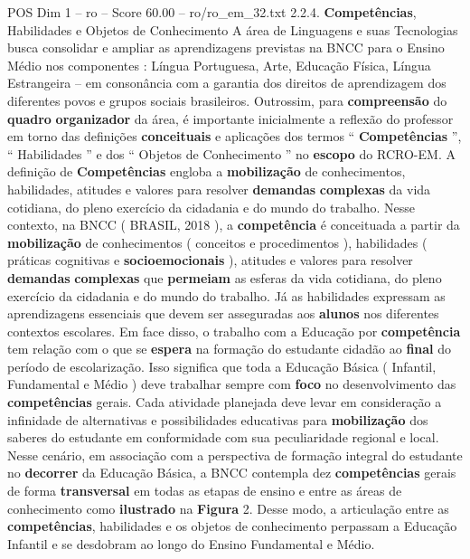 \begin{textsample}{POS Dim 1 – ro – Score 60.00 – ro/ro\_em\_32.txt}  \label{ex:f1_pos_133}
2.2.4. \textbf{Competências}, Habilidades e Objetos de Conhecimento A área de Linguagens e suas Tecnologias busca consolidar e ampliar as aprendizagens previstas na BNCC para o Ensino Médio nos componentes : Língua Portuguesa, Arte, Educação Física, Língua Estrangeira – em consonância com a garantia dos direitos de aprendizagem dos diferentes povos e grupos sociais brasileiros.
Outrossim, para \textbf{compreensão} do \textbf{quadro} \textbf{organizador} da área, é importante inicialmente a reflexão do professor em torno das definições \textbf{conceituais} e aplicações dos termos “ \textbf{Competências} ”, “ Habilidades ” e dos “ Objetos de Conhecimento ” no \textbf{escopo} do RCRO-EM.
A definição de \textbf{Competências} engloba a \textbf{mobilização} de conhecimentos, habilidades, atitudes e valores para resolver \textbf{demandas} \textbf{complexas} da vida cotidiana, do pleno exercício da cidadania e do mundo do trabalho.
Nesse contexto, na BNCC ( BRASIL, 2018 ), a \textbf{competência} é conceituada a partir da \textbf{mobilização} de conhecimentos ( conceitos e procedimentos ), habilidades ( práticas cognitivas e \textbf{socioemocionais} ), atitudes e valores para resolver \textbf{demandas} \textbf{complexas} que \textbf{permeiam} as esferas da vida cotidiana, do pleno exercício da cidadania e do mundo do trabalho.
Já as habilidades expressam as aprendizagens essenciais que devem ser asseguradas aos \textbf{alunos} nos diferentes contextos escolares.
Em face disso, o trabalho com a Educação por \textbf{competência} tem relação com o que se \textbf{espera} na formação do estudante cidadão ao \textbf{final} do período de escolarização.
Isso significa que toda a Educação Básica ( Infantil, Fundamental e Médio ) deve trabalhar sempre com \textbf{foco} no desenvolvimento das \textbf{competências} gerais.
Cada atividade planejada deve levar em consideração a infinidade de alternativas e possibilidades educativas para \textbf{mobilização} dos saberes do estudante em conformidade com sua peculiaridade regional e local.
Nesse cenário, em associação com a perspectiva de formação integral do estudante no \textbf{decorrer} da Educação Básica, a BNCC contempla dez \textbf{competências} gerais de forma \textbf{transversal} em todas as etapas de ensino e entre as áreas de conhecimento como \textbf{ilustrado} na \textbf{Figura} 2.
Desse modo, a articulação entre as \textbf{competências}, habilidades e os objetos de conhecimento perpassam a Educação Infantil e se desdobram ao longo do Ensino Fundamental e Médio.

\end{textsample}
